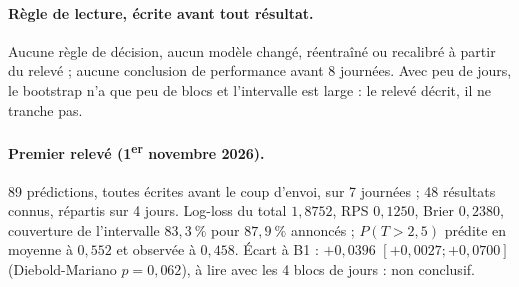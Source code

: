 \paragraph{Règle de lecture, écrite avant tout résultat.} Aucune règle de décision, aucun modèle changé,
réentraîné ou recalibré à partir du relevé ; aucune conclusion de performance avant 8 journées. Avec peu de
jours, le bootstrap n'a que peu de blocs et l'intervalle est large : le relevé décrit, il ne tranche pas.

\paragraph{Premier relevé (1\textsuperscript{er} novembre 2026).} 89 prédictions, toutes écrites avant le
coup d'envoi, sur 7 journées ; 48 résultats connus, répartis sur 4 jours. Log-loss du total \(1{,}8752\), RPS
\(0{,}1250\), Brier \(0{,}2380\), couverture de l'intervalle \(83{,}3~\%\) pour \(87{,}9~\%\) annoncés ;
\(P(T > 2{,}5)\) prédite en moyenne à \(0{,}552\) et observée à \(0{,}458\). Écart à B1 :
\(+0{,}0396\) \([+0{,}0027 ; +0{,}0700]\) (Diebold-Mariano \(p = 0{,}062\)), à lire avec les 4 blocs de
jours : non conclusif.
